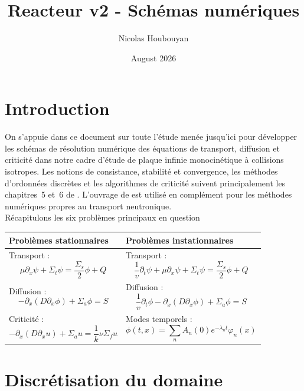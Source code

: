 \documentclass{article}
\title{Reacteur v2 - Schémas numériques}
\author{Nicolas Houbouyan}
\date{August 2026}
\begin{document}
\maketitle


\section{Introduction}
On s'appuie dans ce document sur toute l'étude menée jusqu'ici pour développer les schémas de résolution numérique des équations de transport, diffusion et criticité dans notre cadre d'étude de plaque infinie monocinétique à collisions isotropes. Les notions de consistance, stabilité et convergence, les méthodes d'ordonnées discrètes et les algorithmes de criticité suivent principalement les chapitres~5 et~6 de \textcite{Allaire2018}. L'ouvrage de \textcite{Lewis1984} est utilisé en complément pour les méthodes numériques propres au transport neutronique. \\
Récapitulons les six problèmes principaux en question

\bigskip 
\bigskip 
\bigskip 

\begin{table}[h]  \renewcommand{\arraystretch}{1.4} \begin{tabular}{p{}p{}} \toprule \textbf{Problèmes stationnaires} & \textbf{Problèmes instationnaires} \\ \midrule Transport : \[ \mu\partial_x\psi+\Sigma_t\psi = \frac{\Sigma_s}{2}\phi+Q \] & Transport : \[ \frac1v\partial_t\psi +\mu\partial_x\psi+\Sigma_t\psi = \frac{\Sigma_s}{2}\phi+Q \] \\ Diffusion : \[ -\partial_x(D\partial_x\phi) +\Sigma_a\phi=S \] & Diffusion : \[ \frac1v\partial_t\phi -\partial_x(D\partial_x\phi) +\Sigma_a\phi=S \] \\ Criticité : \[ -\partial_x(D\partial_xu) +\Sigma_a u = \frac1k\nu\Sigma_f u \] & Modes temporels : \[ \phi(t,x) = \sum_n A_n(0)e^{-\lambda_n t}\varphi_n(x) \] \\ \bottomrule \end{tabular} \end{table}

\newpage

\tableofcontents

\section {Discrétisation du domaine}
\label{subsec:discretisation-domaine}
\end{document}
